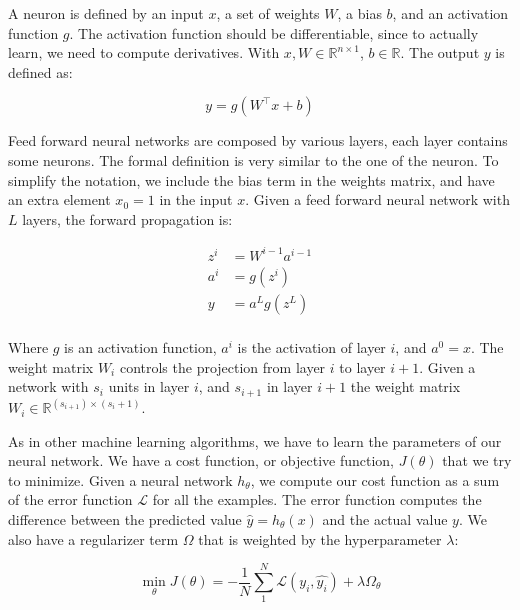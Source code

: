 A neuron is defined by an input $x$, a set of weights $W$, a bias $b$, and an activation function $g$. The activation function should be differentiable, since to actually learn, we need to compute derivatives. With $x, W \in \mathbb{R}^{n\times1}$, $b \in \mathbb{R}$. The output $y$ is defined as: 

\begin{equation}
    y = g(W^{\intercal} x + b)
\end{equation}


Feed forward neural networks are composed by various layers, each layer contains some neurons. The formal definition is very similar to the one of the neuron. To simplify the notation, we include the bias term in the weights matrix, and have an extra element $x_0 = 1$ in the input $x$. Given a feed forward neural network with $L$ layers, the forward propagation is: 

\begin{equation}
\begin{split}
    z^i & = W^{i-1}a^{i-1} \\
    a^{i} & = g(z^i) \\
    y & = a^L g(z^L) \\
\end{split}
\end{equation}

Where $g$ is an activation function, $a^i$ is the activation of layer $i$, and $a^0 = x$. The weight matrix $W_i$ controls the projection from layer $i$ to layer $i+1$. Given a network with $s_i$ units in layer $i$, and $s_{i+1}$ in layer $i+1$ the weight matrix $W_i \in\mathbb{R}^{(s_{i+1})\times (s_i + 1)} $. 

As in other machine learning algorithms, we have to learn the parameters of our neural network. We have a cost function, or objective function, $J(\theta)$ that we try to minimize. Given a neural network $h_\theta$, we compute our cost function as a sum of the error function  $\mathcal{L}$ for all the examples. The error function computes the difference between the predicted value $\hat{y} = h_{\theta}(x)$ and the actual value $y$. We also have a regularizer term $\Omega$ that is weighted by the hyperparameter $\lambda$:

\begin{equation}
    \min_{\theta} J(\theta) = - \frac{1}{N} \sum_{1}^{N} \mathcal{L}(y_i, \hat{y_i}) + \lambda \Omega_\theta
\end{equation}

